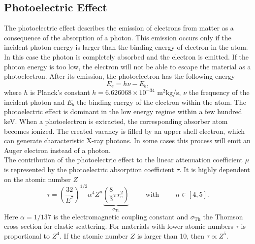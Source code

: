 \subsection{Photoelectric Effect}
The photoelectric effect describes the emission of electrons from matter as a consequence of the absorption of a photon. This emission occurs only if the incident photon energy is larger than the binding energy of electron in the atom. In this case the photon is completely absorbed and the electron is emitted. If the photon energy is too low, the electron will not be able to escape the material as a photoelectron. After its emission, the photoelectron has the following energy
\begin{equation}
E_e = h\nu - E_b,
\end{equation}
where $h$ is Planck's  constant $h = 6.626068 \times 10^{-34}$ m$^2$kg/s, $\nu$ the frequency of the incident photon and $E_b$ the binding energy of the electron within the atom. The photoelectric effect is dominant in the low energy regime within a few hundred keV. When a photoelectron is extracted, the corresponding absorber atom becomes ionized. The created vacancy is filled by an upper shell electron, which can generate characteristic X-ray photons. In some cases this process will emit an Auger electron instead of a photon.\\The contribution of the photoelectric effect to the linear attenuation coefficient $\mu$ is represented by the photoelectric absorption coefficient $\tau$. It is highly dependent on the atomic number $Z$ \cite{Bethge}
\begin{equation}
\tau = \left(\frac{32}{E^7}\right)^{1/2}\alpha^4Z^n\underbrace{\left(\frac{8}{3}\pi r_e^2\right)}_{\sigma_\mathrm{Th}}\hspace{1cm}\mathrm{with}\hspace{1cm}n\in [4,5].
\end{equation}
Here $\alpha=1/137$ is the electromagnetic coupling constant and $\sigma_\mathrm{Th}$ the Thomson cross section for elastic scattering. For materials with lower atomic numbers $\tau$ is proportional to $Z^4$. If the atomic number $Z$ is larger than 10, then $\tau \propto Z^5$.

